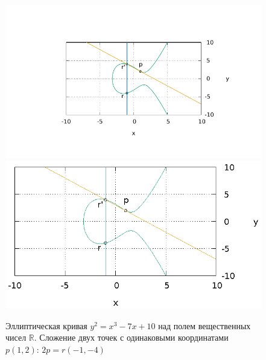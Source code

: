 \begin{figure}
\centering
\ifpdf
\includegraphics[angle=0,scale=1.5]
{./add/discretmath/picellipticsumeq2.pdf}
\else
\includegraphics[angle=0,scale=1.5]
{./add/discretmath/picellipticsumeq2.eps}
\fi
\caption{Эллиптическая кривая $y^2 = x^3 -7 x + 10$ над полем
  вещественных чисел $\mathbb{R}$. Сложение двух точек с одинаковыми
  координатами $p(1,2)$: $2p = r (-1,-4)$}
\label{fig:add:ellipticRsumEq2}
\end{figure}
